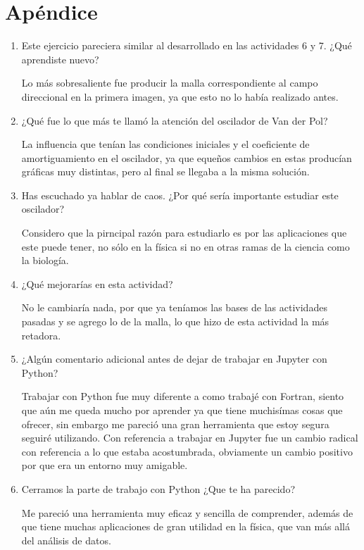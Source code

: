 \documentclass{article}
\begin{document}
\section{Apéndice}
\begin{enumerate}

\item Este ejercicio pareciera similar al desarrollado en las actividades 6 y 7. ¿Qué aprendiste nuevo?

Lo más sobresaliente fue producir la malla correspondiente al campo direccional en la primera imagen, ya que esto no lo había realizado antes.

\item ¿Qué fue lo que más te llamó la atención del oscilador de Van der Pol?

La influencia que tenían las condiciones iniciales y el coeficiente de amortiguamiento en el oscilador, ya que equeños cambios en estas producían gráficas muy distintas, pero al final se llegaba a la misma solución.

\item Has escuchado ya hablar de caos. ¿Por qué sería importante estudiar este oscilador?

Considero que la pirncipal razón para estudiarlo es por las aplicaciones que este puede tener, no sólo en la física si no en otras ramas de la ciencia como la biología.

\item ¿Qué mejorarías en esta actividad?

No le cambiaría nada, por que ya teníamos las bases de las actividades pasadas y se agrego lo de la malla, lo que hizo de esta actividad la más retadora.

\item¿Algún comentario adicional antes de dejar de trabajar en Jupyter con Python?

Trabajar con Python fue muy diferente a como trabajé con Fortran, siento que aún me queda mucho por aprender ya que tiene muchisímas cosas que ofrecer, sin embargo me pareció una gran herramienta que estoy segura seguiré utilizando. Con referencia a trabajar en Jupyter fue un cambio radical con referencia a lo que estaba acostumbrada, obviamente un cambio positivo por que era un entorno muy amigable.

\item Cerramos la parte de trabajo con Python ¿Que te ha parecido?

Me pareció una herramienta muy eficaz y sencilla de comprender, además de que tiene muchas aplicaciones de gran utilidad en la física, que van más allá del análisis de datos.
\end{enumerate}
\end{document}
